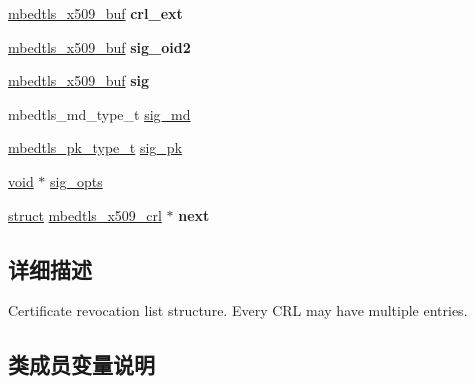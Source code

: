 \begin{DoxyCompactItemize}
\item 
\mbox{\label{structmbedtls__x509__crl_a6bed76483128f2128c0b92cba28ac118}} 
\hyperlink{group__x509__module_ga4d02c9e8e4e2934555e0d132cd2976dc}{mbedtls\+\_\+x509\+\_\+buf} {\bfseries crl\+\_\+ext}
\item 
\mbox{\label{structmbedtls__x509__crl_ac2c9b5655e5dfaabd3d285e8e0b4b34b}} 
\hyperlink{group__x509__module_ga4d02c9e8e4e2934555e0d132cd2976dc}{mbedtls\+\_\+x509\+\_\+buf} {\bfseries sig\+\_\+oid2}
\item 
\mbox{\label{structmbedtls__x509__crl_a91614cb3497ac7220394c04014cf0f2d}} 
\hyperlink{group__x509__module_ga4d02c9e8e4e2934555e0d132cd2976dc}{mbedtls\+\_\+x509\+\_\+buf} {\bfseries sig}
\item 
mbedtls\+\_\+md\+\_\+type\+\_\+t \hyperlink{structmbedtls__x509__crl_a85c03124f3b4a2afe8b5c47fab13a8a9}{sig\+\_\+md}
\item 
\hyperlink{pk_8h_a3fe41eff5605ae727eb9d28dad297020}{mbedtls\+\_\+pk\+\_\+type\+\_\+t} \hyperlink{structmbedtls__x509__crl_a8c94375266c53f6e73d0134dc978151a}{sig\+\_\+pk}
\item 
\hyperlink{interfacevoid}{void} $\ast$ \hyperlink{structmbedtls__x509__crl_ad59e3744b290f19d6400678d364aef77}{sig\+\_\+opts}
\item 
\mbox{\label{structmbedtls__x509__crl_a6dbfb57fe2c749c3bff9f7f45aacec05}} 
\hyperlink{interfacestruct}{struct} \hyperlink{structmbedtls__x509__crl}{mbedtls\+\_\+x509\+\_\+crl} $\ast$ {\bfseries next}
\end{DoxyCompactItemize}


\subsection{详细描述}
Certificate revocation list structure. Every C\+RL may have multiple entries. 

\subsection{类成员变量说明}
\mbox{\label{structmbedtls__x509__crl_a880036b1b4a2b449542f8f1fa389694f}} 

